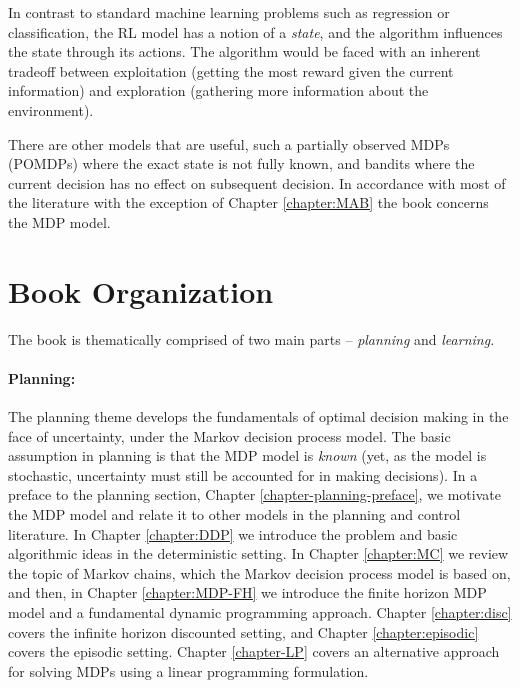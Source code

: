 In contrast to standard machine learning problems such as regression or classification, the RL model
 has a notion of a {\em state}, and the algorithm influences the state
through its actions.
The algorithm would be faced with an inherent tradeoff between
exploitation (getting the most reward given the current information)
and exploration (gathering more information about the environment).


There are other models that are useful, such a partially observed MDPs (POMDPs) where the exact state is not fully known, and bandits where the current decision has no effect on subsequent decision. In accordance with most of the literature with the exception of Chapter \ref{chapter:MAB} the book concerns the MDP model.


\section{Book Organization}

The book is thematically comprised of two main parts -- \textit{planning} and \textit{learning}. 

\paragraph{Planning:} The planning theme develops the fundamentals of optimal decision making in the face of uncertainty, under the Markov decision process model. The basic assumption in planning is that the MDP model is \textit{known} (yet, as the model is stochastic, uncertainty must still be accounted for in making decisions). In a preface to the planning section, Chapter \ref{chapter-planning-preface}, we motivate the MDP model and relate it to other models in the planning and control literature.
In Chapter \ref{chapter:DDP} we introduce the problem and basic algorithmic ideas in the deterministic setting. In Chapter \ref{chapter:MC} we review the topic of Markov chains, which the Markov decision process model is based on, and
then, in Chapter \ref{chapter:MDP-FH} we introduce the finite horizon MDP model and a fundamental dynamic programming approach. Chapter \ref{chapter:disc} covers the infinite horizon discounted setting, and Chapter \ref{chapter:episodic} covers the episodic setting. Chapter \ref{chapter-LP} covers an alternative approach for solving MDPs using a linear programming formulation.


